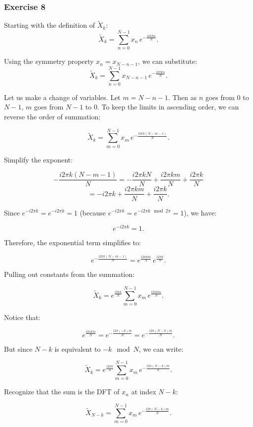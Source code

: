 \documentclass[a4paper]{report}
\begin{document}


\subsubsection{Exercise 8}

Starting with the definition of $\widetilde{X}_k$:
\[
	\widetilde{X}_k = \sum_{n=0}^{N-1} x_n \, e^{-\frac{i2\pi kn}{N}}.
\]

Using the symmetry property $x_n = x_{N - n - 1}$, we can substitute:
\[
	\widetilde{X}_k = \sum_{n=0}^{N-1} x_{N - n - 1} \, e^{-\frac{i2\pi kn}{N}}.
\]

Let us make a change of variables. Let $m = N - n - 1$. Then as $n$ goes from $0$ to $N - 1$, $m$ goes from $N - 1$ to $0$. To keep the limits in ascending order, we can reverse the order of summation:

\[
	\widetilde{X}_k = \sum_{m=0}^{N-1} x_m \, e^{-\frac{i2\pi k (N - m - 1)}{N}}.
\]

Simplify the exponent:

\[
	-\frac{i2\pi k (N - m - 1)}{N} = -\frac{i2\pi k N}{N} + \frac{i2\pi k m}{N} + \frac{i2\pi k}{N}
\]
\[
	= -i2\pi k + \frac{i2\pi k m}{N} + \frac{i2\pi k}{N}.
\]


Since $e^{-i2\pi k} = e^{-i2\pi k} = 1$ (because $e^{-i2\pi k} = e^{-i2\pi k \mod 2\pi} = 1$), we have:

\[
	e^{-i2\pi k} = 1.
\]

Therefore, the exponential term simplifies to:

\[
	e^{-\frac{i2\pi k (N - m - 1)}{N}} = e^{\frac{i2\pi k m}{N}} \, e^{\frac{i2\pi k}{N}}.
\]

Pulling out constants from the summation:

\[
	\widetilde{X}_k = e^{\frac{i2\pi k}{N}} \sum_{m=0}^{N-1} x_m \, e^{\frac{i2\pi k m}{N}}.
\]

Notice that:

\[
	e^{\frac{i2\pi k m}{N}} = e^{-\frac{i2\pi (-k) m}{N}} = e^{-\frac{i2\pi (N - k) m}{N}}.
\]

But since $N - k$ is equivalent to $-k \mod N$, we can write:

\[
	\widetilde{X}_k = e^{\frac{i2\pi k}{N}} \sum_{m=0}^{N-1} x_m \, e^{-\frac{i2\pi (N - k) m}{N}}.
\]

Recognize that the sum is the DFT of $x_n$ at index $N - k$:

\[
	\widetilde{X}_{N - k} = \sum_{m=0}^{N-1} x_m \, e^{-\frac{i2\pi (N - k) m}{N}}.
\]
\end{document}
